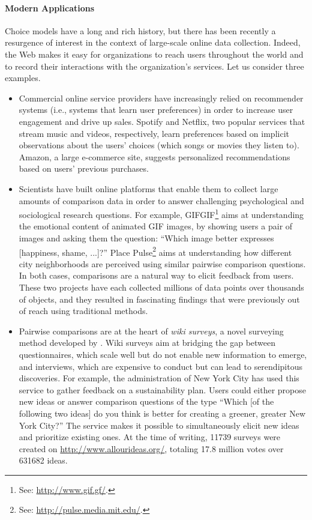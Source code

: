 \paragraph{Modern Applications}
Choice models have a long and rich history, but there has been recently a resurgence of interest in the context of large-scale online data collection.
Indeed, the Web makes it easy for organizations to reach users throughout the world and to record their interactions with the organization's services.
Let us consider three examples.
\begin{itemize}
\item Commercial online service providers have increasingly relied on recommender systems (i.e., systems that learn user preferences) in order to increase user engagement and drive up sales.
Spotify and Netflix, two popular services that stream music and videos, respectively, learn preferences based on implicit observations about the users' choices (which songs or movies they listen to).
Amazon, a large e-commerce site, suggests personalized recommendations based on users' previous purchases.

\item Scientists have built online platforms that enable them to collect large amounts of comparison data in order to answer challenging psychological and sociological research questions.
For example, GIFGIF\footnote{See: \url{http://www.gif.gf/}.} aims at understanding the emotional content of animated GIF images, by showing users a pair of images and asking them the question: ``Which image better expresses [happiness, shame, ...]?''
Place Pulse\footnote{See: \url{http://pulse.media.mit.edu/}.} aims at understanding how different city neighborhoods are perceived using similar pairwise comparison questions.
In both cases, comparisons are a natural way to elicit feedback from users.
These two projects have each collected millions of data points over thousands of objects, and they resulted in fascinating findings that were previously out of reach using traditional methods. 

\item Pairwise comparisons are at the heart of \emph{wiki surveys}, a novel surveying method developed by \citet{salganik2015wiki}.
Wiki surveys aim at bridging the gap between questionnaires, which scale well but do not enable new information to emerge, and interviews, which are expensive to conduct but can lead to serendipitous discoveries.
For example, the administration of New York City has used this service to gather feedback on a sustainability plan.
Users could either propose new ideas or answer comparison questions of the type ``Which [of the following two ideas] do you think is better for creating a greener, greater New York City?''
The service makes it possible to simultaneously elicit new ideas and prioritize existing ones.
At the time of writing, \num{11739} surveys were created on \url{http://www.allourideas.org/}, totaling \num{17.8} million votes over \num{631682} ideas.
\end{itemize}


